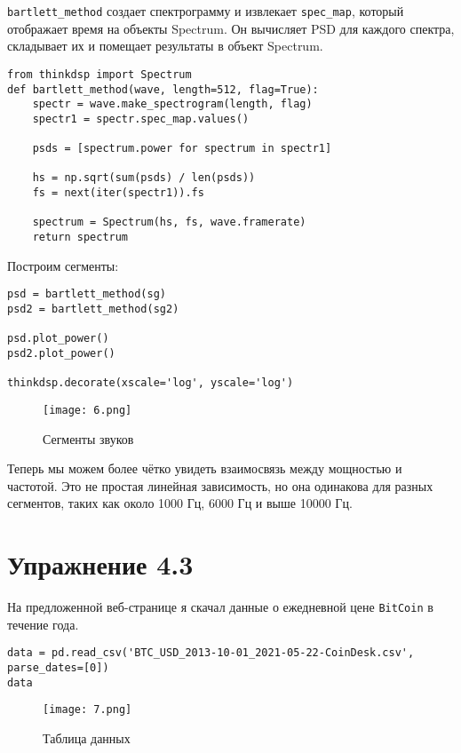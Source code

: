 \documentclass[a4paper,12pt]{report}
\begin{document}
\texttt{bartlett\_method} создает спектрограмму и извлекает \texttt{spec\_map}, который отображает время на объекты Spectrum. Он вычисляет PSD для каждого спектра, складывает их и помещает результаты в объект Spectrum.

\begin{lstlisting}[caption=Функция bartlett\_method]
from thinkdsp import Spectrum
def bartlett_method(wave, length=512, flag=True):
    spectr = wave.make_spectrogram(length, flag)
    spectr1 = spectr.spec_map.values()
    
    psds = [spectrum.power for spectrum in spectr1]
    
    hs = np.sqrt(sum(psds) / len(psds))
    fs = next(iter(spectr1)).fs

    spectrum = Spectrum(hs, fs, wave.framerate)
    return spectrum
\end{lstlisting}

Построим сегменты:

\begin{lstlisting}[caption=Сегменты звуков]
psd = bartlett_method(sg)
psd2 = bartlett_method(sg2)

psd.plot_power()
psd2.plot_power()

thinkdsp.decorate(xscale='log', yscale='log')
\end{lstlisting}

\begin{figure}[H]
        \centering
        \texttt{[image: 6.png]}
        \caption{Сегменты звуков}
        \label{fig:lab4_fig2_1}
\end{figure}

Теперь мы можем более чётко увидеть взаимосвязь между мощностью и частотой. Это не простая линейная зависимость, но она одинакова для разных сегментов, таких как около 1000 Гц, 6000 Гц и выше 10000 Гц.
\chapter{Упражнение 4.3}

На предложенной веб-странице я скачал данные о ежедневной цене \texttt{BitCoin} в течение года.

\begin{lstlisting}[caption=Таблица данных]
data = pd.read_csv('BTC_USD_2013-10-01_2021-05-22-CoinDesk.csv', parse_dates=[0])
data
\end{lstlisting}

\begin{figure}[H]
        \centering
        \texttt{[image: 7.png]}
        \caption{Таблица данных}
        \label{fig:lab4_fig3_1}
\end{figure}
\end{document}
